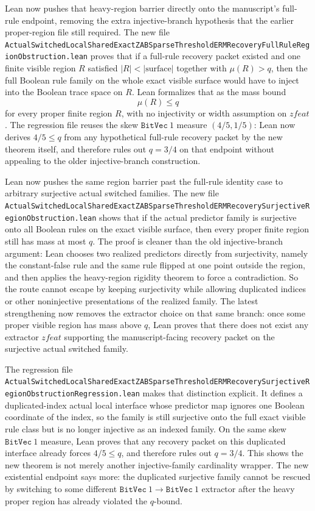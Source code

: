 \documentclass[11pt]{article}
\theoremstyle{remark}
\begin{document}
Lean now pushes that heavy-region barrier directly onto the manuscript's
full-rule endpoint, removing the extra injective-branch hypothesis that the
earlier proper-region file still required.  The new file
\texttt{ActualSwitchedLocalSharedExactZABSparseThresholdERMRecoveryFullRuleRegionObstruction.lean}
proves that if a full-rule recovery packet existed and one finite visible
region \(R\) satisfied \(|R| < |\text{surface}|\) together with \(\mu(R) > q\),
then the full Boolean rule family on the whole exact visible surface would have
to inject into the Boolean trace space on \(R\).  Lean formalizes that as the
mass bound
\[
  \mu(R) \le q
\]
for every proper finite region \(R\), with no injectivity or width assumption
on \(zfeat\).  The regression file reuses the skew \(\texttt{BitVec}\ 1\)
measure \((4/5, 1/5)\): Lean now derives \(4/5 \le q\) from any hypothetical
full-rule recovery packet by the new theorem itself, and therefore rules out
\(q = 3/4\) on that endpoint without appealing to the older injective-branch
construction.

Lean now pushes the same region barrier past the full-rule identity case to
arbitrary surjective actual switched families.  The new file
\texttt{ActualSwitchedLocalSharedExactZABSparseThresholdERMRecoverySurjectiveRegionObstruction.lean}
shows that if the actual predictor family is surjective onto all Boolean rules
on the exact visible surface, then every proper finite region still has mass at
most \(q\).  The proof is cleaner than the old injective-branch argument: Lean
chooses two realized predictors directly from surjectivity, namely the
constant-false rule and the same rule flipped at one point outside the region,
and then applies the heavy-region rigidity theorem to force a contradiction.
So the route cannot escape by keeping surjectivity while allowing duplicated
indices or other noninjective presentations of the realized family.  The latest
strengthening now removes the extractor choice on that same branch: once some
proper visible region has mass above \(q\), Lean proves that there does not
exist any extractor \(zfeat\) supporting the manuscript-facing recovery packet
on the surjective actual switched family.

The regression file
\texttt{ActualSwitchedLocalSharedExactZABSparseThresholdERMRecoverySurjectiveRegionObstructionRegression.lean}
makes that distinction explicit.  It defines a duplicated-index actual local
interface whose predictor map ignores one Boolean coordinate of the index, so
the family is still surjective onto the full exact visible rule class but is no
longer injective as an indexed family.  On the same skew \(\texttt{BitVec}\ 1\)
measure, Lean proves that any recovery packet on this duplicated interface
already forces \(4/5 \le q\), and therefore rules out \(q = 3/4\).  This shows
the new theorem is not merely another injective-family cardinality wrapper.
The new existential endpoint says more: the duplicated surjective family cannot
be rescued by switching to some different \(\texttt{BitVec}\ 1 \to
\texttt{BitVec}\ 1\) extractor after the heavy proper region has already
violated the \(q\)-bound.
\end{document}
